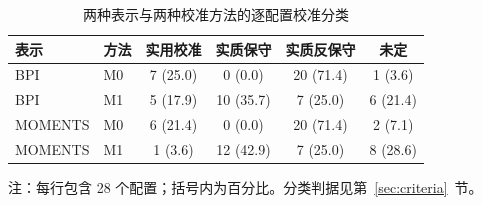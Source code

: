 \begin{table}[t]
\centering
\small
\caption{两种表示与两种校准方法的逐配置校准分类}\label{tab:calibration}
\begin{tabular}{llcccc}
\toprule
表示 & 方法 & 实用校准 & 实质保守 & 实质反保守 & 未定\\
\midrule
BPI & M0 & 7 (25.0) & 0 (0.0) & 20 (71.4) & 1 (3.6)\\
BPI & M1 & 5 (17.9) & 10 (35.7) & 7 (25.0) & 6 (21.4)\\
MOMENTS & M0 & 6 (21.4) & 0 (0.0) & 20 (71.4) & 2 (7.1)\\
MOMENTS & M1 & 1 (3.6) & 12 (42.9) & 7 (25.0) & 8 (28.6)\\
\bottomrule
\end{tabular}

\vspace{0.2em}
\begin{minipage}{0.95\textwidth}
\footnotesize 注：每行包含 28 个配置；括号内为百分比。分类判据见第~\ref{sec:criteria}~节。
\end{minipage}
\end{table}
